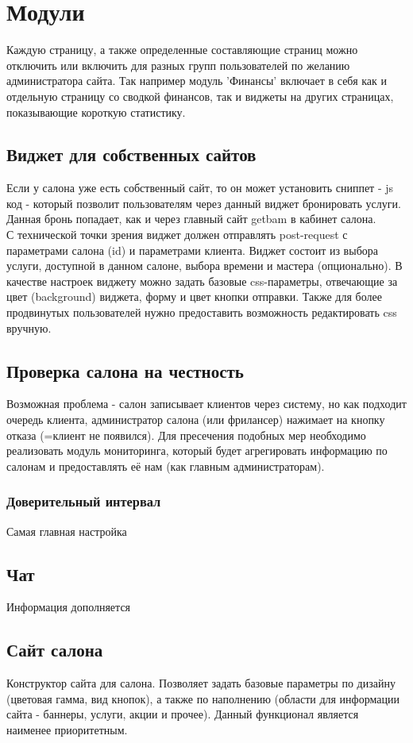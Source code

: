 \documentclass[DIV=calc, paper=a4, fontsize=11pt]{scrartcl} %
\begin{document}
\section{Модули}
Каждую страницу, а также определенные составляющие страниц можно отключить или включить для разных групп пользователей по желанию администратора сайта. Так например модуль 'Финансы' включает в себя как и отдельную страницу со сводкой финансов, так и виджеты на других страницах, показывающие короткую статистику.
\subsection{Виджет для собственных сайтов} \label{subsection:widget}
Если у салона уже есть собственный сайт, то он может установить сниппет - js код - который позволит пользователям через данный виджет бронировать услуги. Данная бронь попадает, как и через главный сайт getbam в кабинет салона.
\\[0.5cm]
С технической точки зрения виджет должен отправлять post-request с параметрами салона (id) и параметрами клиента. 
Виджет состоит из выбора услуги, доступной в данном салоне, выбора времени и мастера (опционально).
В качестве настроек виджету можно задать базовые css-параметры, отвечающие за цвет (background) виджета, форму и цвет кнопки отправки. Также для более продвинутых пользователей нужно предоставить возможность редактировать css вручную.

\subsection{Проверка салона на честность}
Возможная проблема - салон записывает клиентов через систему, но как подходит очередь клиента, администратор салона (или фрилансер) нажимает на кнопку отказа (=клиент не появился). Для пресечения подобных мер необходимо реализовать модуль мониторинга, который будет агрегировать информацию по салонам и предоставлять её нам (как главным администраторам).

\subsubsection{Доверительный интервал}
Самая главная настройка 

\subsection{Чат}
Информация дополняется

\subsection{Сайт салона}
Конструктор сайта для салона. Позволяет задать базовые параметры по дизайну (цветовая гамма, вид кнопок), а также по наполнению (области для информации сайта - баннеры, услуги, акции и прочее). Данный функционал является наименее приоритетным.
\end{document}
